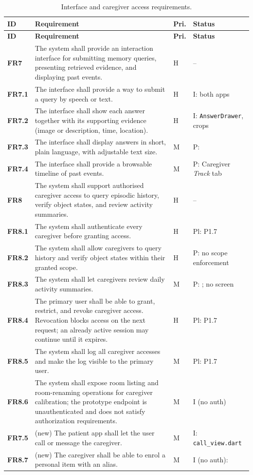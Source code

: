 \begin{ltab}
\begin{longtable}{@{}>{\bfseries}L{1.2cm}L{9.6cm}L{0.8cm}L{3.0cm}@{}}
\caption{Interface and caregiver access requirements.}\\
\toprule
{}\textbf{ID} & \textbf{Requirement} & \textbf{Pri.} & \textbf{Status}\\
\midrule
\endfirsthead
\toprule
{}\textbf{ID} & \textbf{Requirement} & \textbf{Pri.} & \textbf{Status}\\
\midrule
\endhead
\bottomrule
\endfoot
{}FR7 & The system shall provide an interaction interface for
submitting memory queries, presenting retrieved evidence, and displaying past
events. & H & --\\
FR7.1 & The interface shall provide a way to submit a query by speech or text. & H & I: both apps\\
FR7.2 & The interface shall show each answer together with its supporting
evidence (image or description, time, location). & H & I: \texttt{AnswerDrawer}, crops\\
FR7.3 & The interface shall display answers in short, plain language, with
adjustable text size. & M & P: \\
FR7.4 & The interface shall provide a browsable timeline of past events. & M & P: Caregiver \emph{Track} tab\\
FR8 & The system shall support authorised caregiver access to
query episodic history, verify object states, and review activity summaries. & H & --\\
FR8.1 & The system shall authenticate every caregiver before granting access. & H & Pl: P1.7\\
FR8.2 & The system shall allow caregivers to query history and verify object
states within their granted scope. & H & P: no scope enforcement\\
FR8.3 & The system shall let caregivers review daily activity summaries. & M & P: ; no screen\\
FR8.4 & The primary user shall be able to grant, restrict, and revoke caregiver
access. Revocation blocks access on the next request; an already active session
may continue until it expires. & H & Pl: P1.7\\
FR8.5 & The system shall log all caregiver accesses and make the log visible to
the primary user. & M & Pl: P1.7\\
FR8.6 & The system shall expose room listing and room-renaming operations for caregiver calibration; the prototype endpoint is unauthenticated and does not satisfy authorization requirements. & M & I (no auth)\\
FR7.5 & (new) The patient app shall let the user call or message the caregiver. & M & I: \texttt{call\_view.dart}\\
FR8.7 & (new) The caregiver shall be able to enrol a personal item with an alias. & M & I (no auth): \\
\end{longtable}
\end{ltab}

